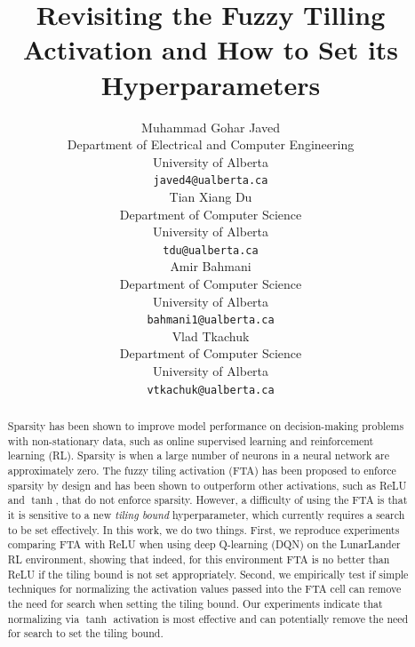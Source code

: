 \documentclass{article}
\title{Revisiting the Fuzzy Tilling Activation and How to Set its Hyperparameters}
\author{%
  Muhammad Gohar Javed \\
  Department of Electrical and Computer Engineering \\
  University of Alberta\\
  \texttt{javed4@ualberta.ca} \\
  \And
  Tian Xiang Du \\
  Department of Computer Science\\
  University of Alberta\\
  \texttt{tdu@ualberta.ca} \\
  \AND
  Amir Bahmani \\
  Department of Computer Science\\
  University of Alberta\\
  \texttt{bahmani1@ualberta.ca} \\
  \And
  Vlad Tkachuk \\
  Department of Computer Science\\
  University of Alberta\\
  \texttt{vtkachuk@ualberta.ca} \\
}
\begin{document}
\maketitle


\begin{abstract}
  Sparsity has been shown to improve model performance on decision-making problems with non-stationary data, such as online supervised learning and reinforcement learning (RL).
  Sparsity is when a large number of neurons in a neural network are approximately zero.
  The fuzzy tiling activation (FTA) has been proposed to enforce sparsity by design and has been shown to outperform other activations, such as ReLU and $\tanh$, that do not enforce sparsity.
  However, a difficulty of using the FTA is that it is sensitive to a new \textit{tiling bound} hyperparameter, which currently requires a search to be set effectively.
  In this work, we do two things. First, we reproduce experiments comparing FTA with ReLU when using deep Q-learning (DQN) on the LunarLander RL environment, showing that indeed, for this environment FTA is no better than ReLU if the tiling bound is not set appropriately.
  Second, we empirically test if simple techniques for normalizing the activation values passed into the FTA cell can remove the need for search when setting the tiling bound.
  Our experiments indicate that normalizing via $\tanh$ activation is most effective and can potentially remove the need for search to set the tiling bound.


\end{abstract}
\end{document}
